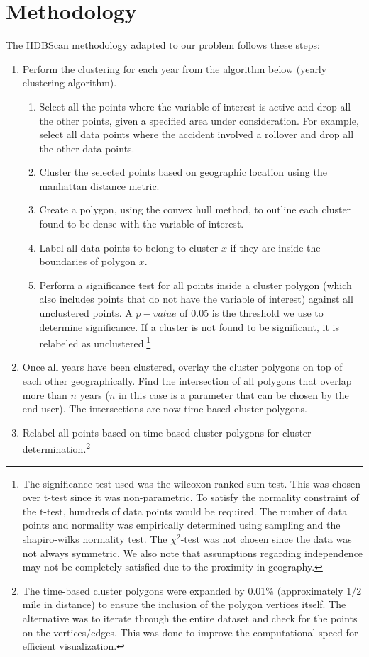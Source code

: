 \documentclass{article}
\begin{document}
\section{Methodology}
The HDBScan methodology adapted to our problem follows these steps:
\begin{enumerate}
	\item Perform the clustering for each year from the algorithm below (yearly clustering algorithm).
	\begin{enumerate}
			\item Select all the points where the variable of interest is active and drop all the other points, given a specified area under consideration. For example, select all data points where the accident involved a rollover and drop all the other data points.
			\item Cluster the selected points based on geographic location using the manhattan distance metric.
			\item Create a polygon, using the convex hull method, to outline each cluster found to be dense with the variable of interest.
			\item Label all data points to belong to cluster $x$ if they are inside the boundaries of polygon $x$.
			\item Perform a significance test for all points inside a cluster polygon (which also includes points that do not have the variable of interest) against all unclustered points. A $p-value$ of 0.05 is the threshold we use to determine significance. If a cluster is not found to be significant, it is relabeled as unclustered.\footnote{The significance test used was the wilcoxon ranked sum test. This was chosen over t-test since it was non-parametric. To satisfy the normality constraint of the t-test, hundreds of data points would be required. The number of data points and normality was empirically determined using sampling and the shapiro-wilks normality test. The $\chi^2$-test was not chosen since the data was not always symmetric. We also note that assumptions regarding independence may not be completely satisfied due to the proximity in geography.}
	\end{enumerate}
	\item Once all years have been clustered, overlay the cluster polygons on top of each other geographically. Find the intersection of all polygons that overlap more than $n$ years ($n$ in this case is a parameter that can be chosen by the end-user). The intersections are now time-based cluster polygons.
	\item Relabel all points based on time-based cluster polygons for cluster determination.\footnote{The time-based cluster polygons were expanded by 0.01\% (approximately 1/2 mile in distance) to ensure the inclusion of the polygon vertices itself. The alternative was to iterate through the entire dataset and check for the points on the vertices/edges. This was done to improve the computational speed for efficient visualization.}

\end{enumerate}
\end{document}
